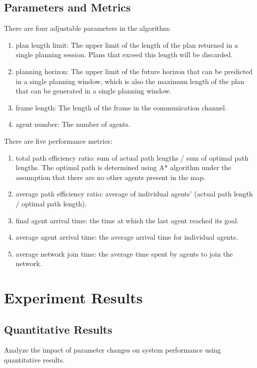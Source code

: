 \subsection*{Parameters and Metrics}
There are four adjustable parameters in the algorithm: 
\begin{enumerate}
    \item plan length limit: The upper limit of the length of the plan returned in a single planning session. Plans that exceed this length will be discarded.
    \item planning horizon: The upper limit of the future horizon that can be predicted in a single planning window, which is also the maximum length of the plan that can be generated in a single planning window.
    \item frame length: The length of the frame in the communication channel.
    \item agent number: The number of agents.
\end{enumerate}

There are five performance metrics:
\begin{enumerate}
    \item total path efficiency ratio: sum of actual path lengths / sum of optimal path lengths. 
    The optimal path is determined using A* algorithm under the assumption that there are no other agents present in the map.
    \item average path efficiency ratio: average of individual agents' (actual path length / optimal path length).
    \item final agent arrival time: the time at which the last agent reached its goal.
    \item average agent arrival time: the average arrival time for individual agents.
    \item average network join time: the average time spent by agents to join the network.
\end{enumerate}

\section{Experiment Results}
\subsection{Quantitative Results}

Analyze the impact of parameter changes on system performance using quantitative results.



